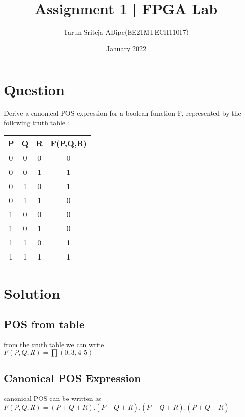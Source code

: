 \documentclass{article}
\title{Assignment 1 | FPGA Lab}
\author{Tarun Sriteja ADipe(EE21MTECH11017)}
\date{January 2022}
\begin{document}
\maketitle

\section{Question}

Derive a canonical POS expression for a boolean function F, represented by the following truth table :

 \begin{table}[h!]
  \begin{center}
    \begin{tabular}{|c|c|c|c|}
    \hline
      \textbf{P} & \textbf{Q} & \textbf{R} & \textbf{F(P,Q,R)}\\ 
      \hline
      0 & 0 & 0 & 0\\ \hline
      0 & 0 & 1 & 1\\  \hline
      0 & 1 & 0 & 1\\ \hline
      0 & 1 & 1 & 0\\ \hline
      1 & 0 & 0 & 0\\ \hline
      1 & 0 & 1 & 0\\ \hline
      1 & 1 & 0 & 1\\ \hline
      1 & 1 & 1 & 1\\ \hline
    \end{tabular}
  \end{center}
\end{table}


\section{Solution}

\subsection{POS from table}
from the truth table we can write  \\

    $F(P,Q,R) =  \prod(0,3,4,5)$\\
\subsection{Canonical POS Expression}
canonical POS can be written as \\

    $F(P,Q,R) =  (P+Q+R).(P+\overline{Q}+\overline{R}).(\overline{P}+Q+R). 
    (\overline{P}+Q+\overline{R})$
\end{document}
